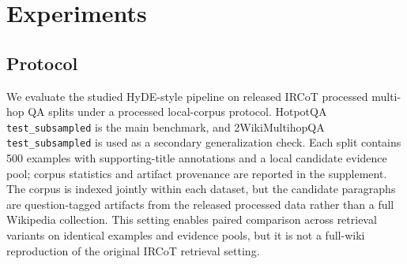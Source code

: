 \section{Experiments}
\label{sec:experiments}

\subsection{Protocol}
\label{sec:dataset_setting}

We evaluate the studied HyDE-style pipeline on released IRCoT processed multi-hop QA splits under a processed local-corpus protocol. HotpotQA \texttt{test\_subsampled} is the main benchmark, and 2WikiMultihopQA \texttt{test\_subsampled} is used as a secondary generalization check. Each split contains 500 examples with supporting-title annotations and a local candidate evidence pool; corpus statistics and artifact provenance are reported in the supplement. The corpus is indexed jointly within each dataset, but the candidate paragraphs are question-tagged artifacts from the released processed data rather than a full Wikipedia collection. This setting enables paired comparison across retrieval variants on identical examples and evidence pools, but it is not a full-wiki reproduction of the original IRCoT retrieval setting.

